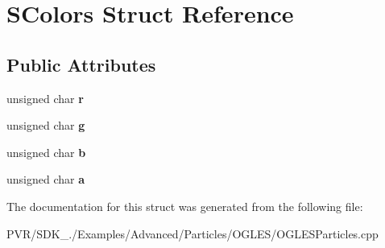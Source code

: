 \hypertarget{struct_s_colors}{\section{S\+Colors Struct Reference}
\label{struct_s_colors}
}
\subsection*{Public Attributes}
\begin{DoxyCompactItemize}
\item 
\hypertarget{struct_s_colors_a45210690afe5a5e119d4fb61c3db240c}{unsigned char {\bfseries r}}\label{struct_s_colors_a45210690afe5a5e119d4fb61c3db240c}

\item 
\hypertarget{struct_s_colors_a2339e64ba5ff603f378b5575589410e6}{unsigned char {\bfseries g}}\label{struct_s_colors_a2339e64ba5ff603f378b5575589410e6}

\item 
\hypertarget{struct_s_colors_ab881a7b35d6b6627bd3eeebd4ef8c491}{unsigned char {\bfseries b}}\label{struct_s_colors_ab881a7b35d6b6627bd3eeebd4ef8c491}

\item 
\hypertarget{struct_s_colors_a88b7795a4cd790a8b4962ea67fb9452d}{unsigned char {\bfseries a}}\label{struct_s_colors_a88b7795a4cd790a8b4962ea67fb9452d}

\end{DoxyCompactItemize}


The documentation for this struct was generated from the following file\+:\begin{DoxyCompactItemize}
\item 
P\+V\+R/\+S\+D\+K\+\_./\+Examples/\+Advanced/\+Particles/\+O\+G\+L\+E\+S/O\+G\+L\+E\+S\+Particles.\+cpp\end{DoxyCompactItemize}

